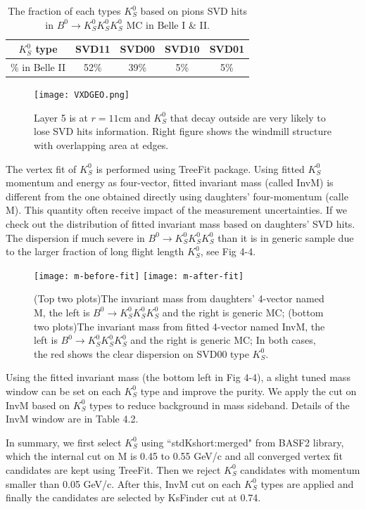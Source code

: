 \begin{table}[H]
	\centering
	\begin{tabular}{|c|c|c|c|c|}
	\hline
	$K_S^0$ type & SVD11 & SVD00 & SVD10 & SVD01\\
	\hline
	\% in Belle II & 52\% & 39\% & 5\% & 5\%\\
	\hline
	\end{tabular}
	\caption{The fraction of each types $K_S^0$ based on pions SVD hits in $B^0 \to K_S^0  K_S^0  K_S^0$ MC in Belle I \& II.}
\end{table}
\begin{figure}[htpb]
	\centering
	\texttt{[image: VXDGEO.png]}
	\caption{Layer 5 is at $r = 11$cm and $K_S^0$ that decay outside are very likely to lose SVD hits information. Right figure shows the windmill structure with overlapping area at edges. }
\end{figure}

The vertex fit of $K_S^0$ is performed using TreeFit package. \cite{refId0} Using fitted $K_S^0$ momentum and energy as four-vector, fitted invariant mass (called InvM) is different from the one obtained directly using daughters' four-momentum (calle M). This quantity often receive impact of the measurement uncertainties. If we check out the distribution of fitted invariant mass based on daughters' SVD hits. The dispersion if much severe in $B^0 \to K_S^0  K_S^0  K_S^0$ than it is in generic sample due to the larger fraction of long flight length $K_S^0$, see Fig 4-4. 

\begin{figure}[htpb]
	\centering
	\texttt{[image: m-before-fit]}
	\texttt{[image: m-after-fit]}
	\caption{(Top two plots)The invariant mass from daughters' 4-vector named M, the left is $B^0 \to K_S^0  K_S^0  K_S^0$  and the right is generic MC;
	(bottom two plots)The invariant mass from fitted 4-vector named InvM, the left is $B^0 \to K_S^0  K_S^0  K_S^0$  and the right is generic MC;
	In both cases, the red shows the clear dispersion on SVD00 type $K_S^0$.}
	\label{fig:m-before-fit}
\end{figure}
Using the fitted invariant mass (the bottom left in Fig 4-4), a slight tuned mass window can be set on each $K_S^0$ type and improve the purity. We apply the cut on InvM based on $K_S^0$ types to reduce background in mass sideband.
 Details of the InvM window are in Table 4.2.
 
 In summary, we first select $K_S^0$ using ``stdKshort:merged" from BASF2 library, which the internal cut on M is 0.45 to 0.55 GeV/c and all converged vertex fit candidates are kept using TreeFit. Then we reject $K_S^0$ candidates with momentum smaller than 0.05 GeV/c. After this, InvM cut on each $K_S^0$ types are applied and finally the candidates are selected by KsFinder cut at 0.74. 
 
